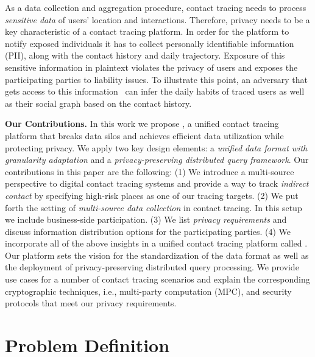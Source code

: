 As a data collection and aggregation procedure, contact tracing needs to process \emph{sensitive data} of users' location and interactions. 
Therefore, privacy needs to be a key characteristic of a contact tracing platform. 
In order for the platform to notify exposed individuals it has to collect personally identifiable information (PII), along with the contact history and daily trajectory.  Exposure of this sensitive information in plaintext violates the privacy of users and exposes the participating parties to liability issues. To illustrate this point, an adversary that gets access to this information~\cite{corona-sniffer} can infer the daily habits of traced users as well as their social graph based on the contact history. 

\textbf{Our Contributions.} In this work we propose \sysname, a unified contact tracing platform that breaks data silos and achieves efficient data utilization while protecting privacy. We apply two key design elements: a \emph{unified data format with granularity adaptation} and a \emph{privacy-preserving distributed query framework}. %
Our contributions in this paper are the following: (1) We introduce a multi-source perspective to digital contact tracing systems and provide a way to track \emph{indirect contact} by specifying high-risk places as one of our tracing targets. (2) We put forth the setting of \emph{multi-source data collection} in contact tracing. In this setup we include business-side participation. (3) We list \emph{privacy requirements} and discuss information distribution options for the participating parties. (4) We incorporate all of the above insights in a unified contact tracing platform called \sysname. Our platform sets the vision for the standardization of the data format as well as the deployment of privacy-preserving distributed query processing. We provide use cases for a number of contact tracing scenarios and explain the corresponding cryptographic techniques, i.e., multi-party computation (MPC), and security protocols that meet our privacy requirements. 


\section{Problem Definition}


